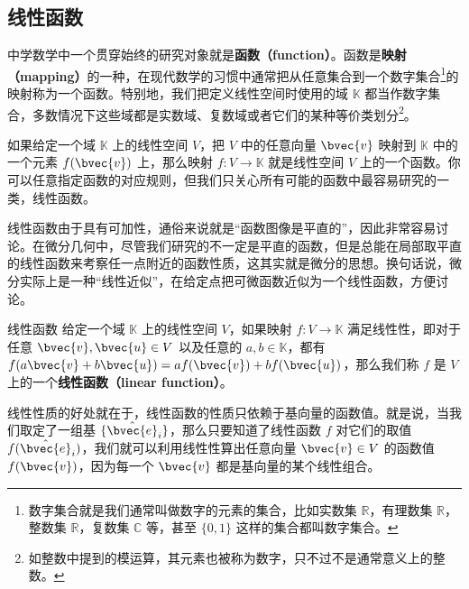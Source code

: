 


\subsection{线性函数}

中学数学中一个贯穿始终的研究对象就是\textbf{函数（function）}。函数是\textbf{映射（mapping）}的一种，在现代数学的习惯中通常把从任意集合到一个数字集合\footnote{数字集合就是我们通常叫做数字的元素的集合，比如实数集 $\mathbb{R}$，有理数集 $\mathbb{R}$，整数集 $\mathbb{R}$，复数集 $\mathbb{C}$ 等，甚至 $\{0, 1\}$ 这样的集合都叫数字集合。}的映射称为一个函数。特别地，我们把定义线性空间时使用的域 $\mathbb{K}$ 都当作数字集合，多数情况下这些域都是实数域、复数域或者它们的某种等价类划分\footnote{如整数中提到的模运算，其元素也被称为数字，只不过不是通常意义上的整数。}。

如果给定一个域 $\mathbb{K}$ 上的线性空间 $V$，把 $V$ 中的任意向量 $\bvec{v}$ 映射到 $\mathbb{K}$ 中的一个元素 $f(\bvec{v})$ 上，那么映射 $f:V\rightarrow\mathbb{K}$ 就是线性空间 $V$ 上的一个函数。你可以任意指定函数的对应规则，但我们只关心所有可能的函数中最容易研究的一类，线性函数。

线性函数由于具有可加性，通俗来说就是“函数图像是平直的”，因此非常容易讨论。在微分几何中，尽管我们研究的不一定是平直的函数，但是总能在局部取平直的线性函数来考察任一点附近的函数性质，这其实就是微分的思想。换句话说，微分实际上是一种“线性近似”，在给定点把可微函数近似为一个线性函数，方便讨论。

\begin{definition}{线性函数}\label{def_DualSp_3}
给定一个域 $\mathbb{K}$ 上的线性空间 $V$，如果映射 $f:V\rightarrow\mathbb{K}$ 满足线性性，即对于任意 $\bvec{v}, \bvec{u}\in V$ 以及任意的 $a, b\in\mathbb{K}$，都有 $f(a\bvec{v}+b\bvec{u})=af(\bvec{v})+bf(\bvec{u})$，那么我们称 $f$ 是 $V$ 上的一个\textbf{线性函数（linear function）}。
\end{definition}

线性性质的好处就在于，线性函数的性质只依赖于基向量的函数值。就是说，当我们取定了一组基 $\{\hat{\bvec{e}}_i\}$，那么只要知道了线性函数 $f$ 对它们的取值 $f(\hat{\bvec{e}}_i)$，我们就可以利用线性性算出任意向量 $\bvec{v}\in V$ 的函数值 $f(\bvec{v})$，因为每一个 $\bvec{v}$ 都是基向量的某个线性组合。

